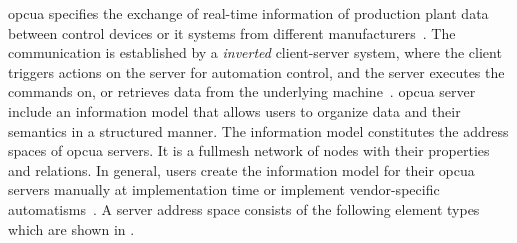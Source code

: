 \documentclass[
a4paper,
twoside,
headsepline,
cleardoublepage=empty,
parskip=half,
draft=false
]{scrbook}
\begin{document}
				\gls{opcua} specifies the exchange of real-time information of production plant data between control devices or \gls{it} systems from different manufacturers~\cite{venkatesh2005validating}.
				The communication is established by a \textit{inverted} client-server system, where the client triggers actions on the server for automation control, and the server executes the commands on, or retrieves data from the underlying machine~\cite{imtiaz2013scalability}.
				\gls{opcua} server include an information model that allows users to organize data and their semantics in a structured manner. 
				The information model constitutes the address spaces of \gls{opcua} servers. 
				It is a fullmesh network of nodes with their properties and relations.
				In general, users create the information model for their \gls{opcua} servers manually at implementation time or implement vendor-specific automatisms~\cite{henssen2014online}.
				A server address space consists of the following element types which are shown in .
				
\end{document}
